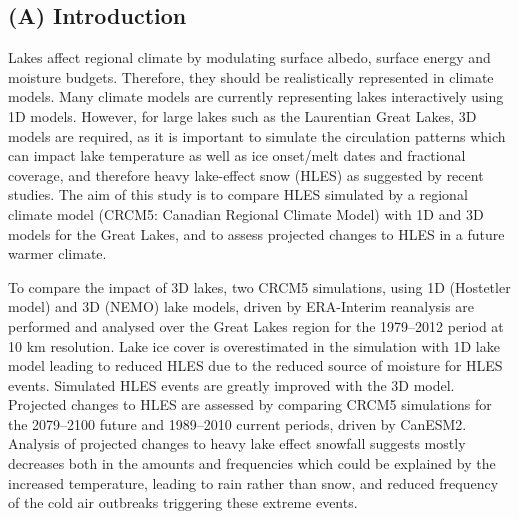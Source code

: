 \documentclass[a0b,landscape]{a0poster}
\begin{document}
\begin{multicols*}{4} %



\section*{(A) Introduction}
Lakes affect regional climate by modulating surface albedo, surface energy and moisture budgets.
Therefore, they should be realistically represented in climate models. Many
climate models are currently representing lakes interactively using 1D models.
However, for large lakes such as the Laurentian Great Lakes, 3D models are
required, as it is important to simulate the circulation patterns which can
impact lake temperature as well as ice onset/melt dates and fractional coverage,
and therefore heavy lake-effect snow (HLES) as suggested by recent studies. The
aim of this study is to compare HLES simulated by a regional climate model
(CRCM5: Canadian Regional Climate Model) with 1D and 3D models for the Great
Lakes, and to assess projected changes to HLES in a future warmer climate.

To compare the impact of 3D lakes, two CRCM5 simulations, using 1D (Hostetler
model) and 3D (NEMO) lake models, driven by ERA-Interim reanalysis are performed
and analysed over the Great Lakes region for the 1979–2012 period at 10 km
resolution. Lake ice cover is overestimated in the simulation with 1D lake model
leading to reduced HLES due to the reduced source of moisture for HLES events.
Simulated HLES events are greatly improved with the 3D model. Projected changes
to HLES are assessed by comparing CRCM5 simulations for the 2079–2100 future and
1989–2010 current periods, driven by CanESM2. Analysis of projected changes to
heavy lake effect snowfall suggests mostly decreases both in the amounts and
frequencies which could be explained by the increased temperature, leading to
rain rather than snow, and reduced frequency of the cold air outbreaks
triggering these extreme events.




\end{multicols*}
\end{document}
